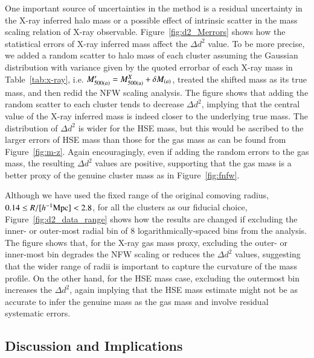 \documentclass[iop, apj]{emulateapj}
\newcommand{\?}{\stackrel{?}{=}}
\begin{document}
One important source of uncertainties in the method is a residual
uncertainty in the X-ray inferred halo mass or a possible effect of
intrinsic scatter in the mass scaling relation of X-ray observable.
Figure~\ref{fig:d2_Merrors} shows how the statistical errors of X-ray
inferred mass affect the $\Delta d^2$ value. To be more precise, we
added a random scatter to halo mass of each cluster
assuming the Gaussian distribution with variance given by the quoted
errorbar of each X-ray mass in Table~\ref{tab:x-ray},
i.e. $M^\prime_{500 (a)}=M_{\rm 500 (a)}^X+\delta M_{(a)}$, treated the
shifted mass as its true mass, and then redid the NFW scaling
analysis. The figure shows that adding the random scatter to each
cluster tends to decrease $\Delta d^2$, implying that the central value
of the X-ray inferred mass is indeed closer to the underlying true
mass. The distribution of $\Delta d^2$ is wider for the HSE mass, but
this would be ascribed to the larger errors of HSE mass than those for
the gas mass as can be found from Figure~\ref{fig:m-z}. Again
encouragingly, even if adding the random errors to the gas mass, the
resulting $\Delta d^2$ values are positive, supporting that the gas mass
is a better proxy of the genuine cluster mass as in
Figure~\ref{fig:fnfw}.

Although we have used the fixed range of the original comoving radius,
$0.14\le R/[h^{-1}{\rm Mpc}]<2.8$, for all the clusters as our fiducial
choice, Figure~\ref{fig:d2_data_range} shows how the results are changed
if excluding the inner- or outer-most radial bin of 8
logarithmically-spaced bins from the analysis. The figure shows that,
for the X-ray gas mass proxy, excluding the outer- or inner-most bin
degrades the NFW scaling or reduces the $\Delta d^2$ values, suggesting
that the wider range of radii is important to capture the curvature of
the mass profile.  On the other hand, for the HSE mass case, excluding
the outermost bin increases the $\Delta d^2$, again implying that the
HSE mass estimate might not be as accurate to infer the genuine mass as
the gas mass and involve residual systematic errors.

  
\subsection{Discussion and Implications}
\end{document}
